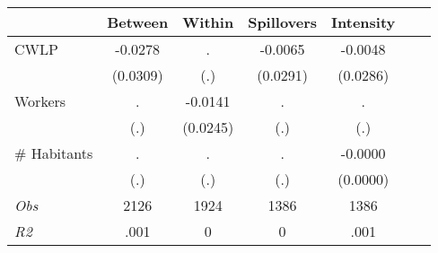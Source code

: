 \begin{tabular}{l*{6}{c}}\hline&\multicolumn{1}{c}{Between}&\multicolumn{1}{c}{Within}&\multicolumn{1}{c}{Spillovers}&\multicolumn{1}{c}{Intensity}\\ \hline 
CWLP & -0.0278 & . & -0.0065 & -0.0048 \\
 & (0.0309) & (.) & (0.0291) & (0.0286) \\
Workers & . & -0.0141 & . & . \\
 & (.) & (0.0245) & (.) & (.) \\
\# Habitants & . & . & . & -0.0000 \\
  & (.) & (.) & (.) & (0.0000) \\
\hline \textit{Obs} & 2126 & 1924 & 1386 & 1386  \\ \textit{R2} & .001 & 0 & 0 & .001 \\ \hline \end{tabular}
